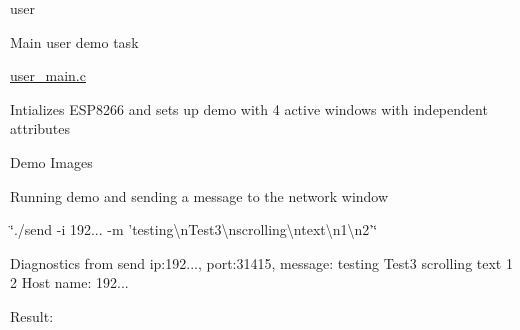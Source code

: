 user
\begin{DoxyItemize}
\item Main user demo task
\item \hyperlink{user__main_8c}{user\-\_\-main.\-c}
\begin{DoxyItemize}
\item Intializes E\-S\-P8266 and sets up demo with 4 active windows with independent attributes
\end{DoxyItemize}
\end{DoxyItemize}

\begin{DoxyParagraph}{Demo Images}

\begin{DoxyItemize}
\item Running demo and sending a message to the network window
\item \char`\"{}./send -\/i 192... -\/m 'testing\textbackslash{}n\-Test3\textbackslash{}nscrolling\textbackslash{}ntext\textbackslash{}n1\textbackslash{}n2'\char`\"{}
\begin{DoxyItemize}
\item Diagnostics from send ip\-:192..., port\-:31415, message\-: testing Test3 scrolling text 1 2 Host name\-: 192...
\item Result\-:  
\end{DoxyItemize}
\end{DoxyItemize}
\end{DoxyParagraph}
